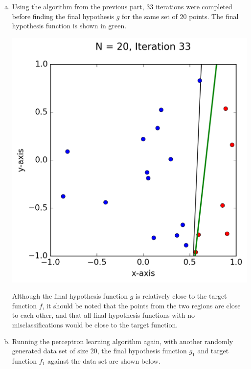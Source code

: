 \documentclass[a4paper]{article}
\begin{document}
\begin {description}
\begin{doublespace}
\begin{enumerate}[(a)]
\item Using the algorithm from the previous part, 33 iterations were completed before finding the final hypothesis $g$ for the same set of 20 points. The final hypothesis function is shown in green.

\begin{center}
\includegraphics{Problem_4b.png}
\end{center}

Although the final hypothesis function $g$ is relatively close to the target function $f$, it should be noted that the points from the two regions are close to each other, and that all final hypothesis functions with no misclassifications would be close to the target function.

\item Running the perceptron learning algorithm again, with another randomly generated data set of size 20, the final hypothesis function $g_1$ and target function $f_1$ against the data set are shown below.


\end{enumerate}
\end{doublespace}
\end{description}
\end{document}
